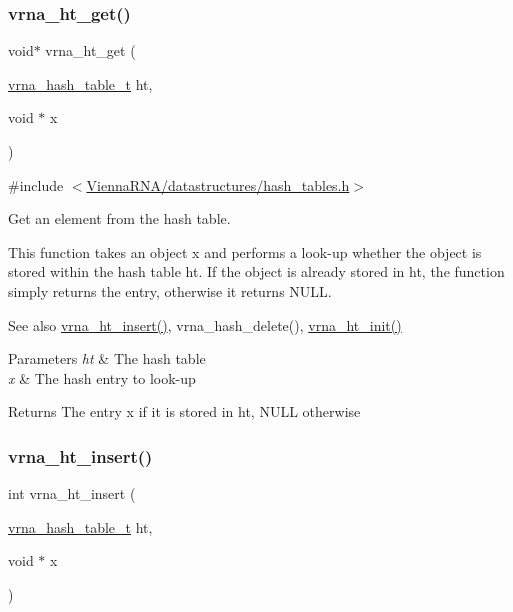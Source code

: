 \subsubsection{\texorpdfstring{vrna\_ht\_get()}{vrna\_ht\_get()}}
{\footnotesize\ttfamily void$\ast$ vrna\+\_\+ht\+\_\+get (\begin{DoxyParamCaption}\item[{\mbox{\hyperlink{group__hash__table__utils_gabc7c6f41b718c8e23929e528891a89c4}{vrna\+\_\+hash\+\_\+table\+\_\+t}}}]{ht,  }\item[{void $\ast$}]{x }\end{DoxyParamCaption})}



{\ttfamily \#include $<$\mbox{\hyperlink{hash__tables_8h}{Vienna\+R\+N\+A/datastructures/hash\+\_\+tables.\+h}}$>$}



Get an element from the hash table. 

This function takes an object {\ttfamily x} and performs a look-\/up whether the object is stored within the hash table {\ttfamily ht}. If the object is already stored in {\ttfamily ht}, the function simply returns the entry, otherwise it returns {\ttfamily N\+U\+LL}.

\begin{DoxySeeAlso}{See also}
\mbox{\hyperlink{group__hash__table__utils_ga4d2189ce8048f031a15ca5e4b290d494}{vrna\+\_\+ht\+\_\+insert()}}, vrna\+\_\+hash\+\_\+delete(), \mbox{\hyperlink{group__hash__table__utils_ga37d1c7e13087a2b7c1b87fda34577c29}{vrna\+\_\+ht\+\_\+init()}}
\end{DoxySeeAlso}

\begin{DoxyParams}{Parameters}
{\em ht} & The hash table \\
\hline
{\em x} & The hash entry to look-\/up \\
\hline
\end{DoxyParams}
\begin{DoxyReturn}{Returns}
The entry {\ttfamily x} if it is stored in {\ttfamily ht}, {\ttfamily N\+U\+LL} otherwise 
\end{DoxyReturn}
\mbox{\label{group__hash__table__utils_ga4d2189ce8048f031a15ca5e4b290d494}} 
\subsubsection{\texorpdfstring{vrna\_ht\_insert()}{vrna\_ht\_insert()}}
{\footnotesize\ttfamily int vrna\+\_\+ht\+\_\+insert (\begin{DoxyParamCaption}\item[{\mbox{\hyperlink{group__hash__table__utils_gabc7c6f41b718c8e23929e528891a89c4}{vrna\+\_\+hash\+\_\+table\+\_\+t}}}]{ht,  }\item[{void $\ast$}]{x }\end{DoxyParamCaption})}




